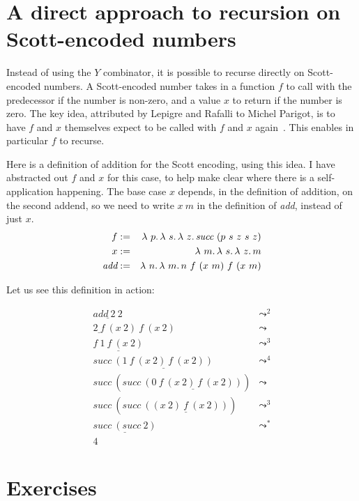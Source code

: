 \section{A direct approach to recursion on Scott-encoded numbers}

Instead of using the $Y$ combinator, it is possible to recurse
directly on Scott-encoded numbers.  A Scott-encoded number takes in a
function $f$ to call with the predecessor if the number is non-zero,
and a value $x$ to return if the number is zero.  The key idea,
attributed by Lepigre and Rafalli to Michel Parigot, is to have $f$
and $x$ themselves expect to be called with $f$ and $x$
again~\cite{lepigre:rafalli19}.  This enables in particular $f$ to
recurse.

Here is a definition of addition for the Scott encoding,
using this idea. I have abstracted out $f$ and $x$ for this
case, to help make clear where there is a self-application
happening.  The base case $x$ depends, in the definition of addition,
on the second addend, so we need to write $x\ m$ in the definition
of \textit{add}, instead of just $x$.
\begin{eqnarray*}
f & := & \lam{p}{\lam{s}{\lam{z}{\textit{succ}\ (p\ s\ z\ s\ z)}}} \\
x & := & \ \lam{m}{\lam{s}{\lam{z}{m}}} \\
\textit{add} & := & \lam{n}{\lam{m}{n\ f\ (x\ m)\ f\ (x\ m)}}
\end{eqnarray*}

\noindent Let us see this definition in action:

\[
\begin{array}{ll}
  \underline{\textit{add}\ 2\ 2} & \leadsto^2 \\
  \underline{2\ f}\ (x\ 2)\ f\ (x\ 2) & \leadsto \\
  \underline{f\ 1\ f\ (x\ 2)} & \leadsto^3 \\
  \textit{succ}\ \underline{(1\ f\ (x\ 2)\ f\ (x\ 2))} & \leadsto^4 \\
  \textit{succ}\ (\textit{succ}\ \underline{(0\ f\ (x\ 2)\ f\ (x\ 2))}) & \leadsto \\
  \textit{succ}\ (\textit{succ}\ \underline{((x\ 2)\ f\ (x\ 2))}) & \leadsto^3 \\
  \underline{\textit{succ}\ (\textit{succ}\ 2)} & \leadsto^* \\    
  4
\end{array}
  \]

\section{Exercises}

